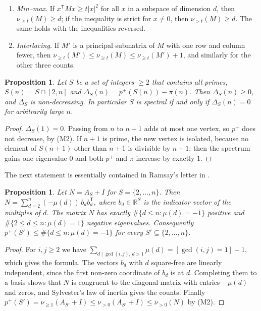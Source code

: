 \documentclass[11pt]{amsart}
\newtheorem{proposition}[theorem]{Proposition}
\theoremstyle{definition}
\theoremstyle{remark}
\newcommand{\pp}{p^{+}}
\newcommand{\R}{\mathbb R}
\newcommand{\nuge}[1]{\nu_{\ge #1}}
\begin{document}
\begin{enumerate}[label=\textup{(M\arabic*)},leftmargin=3em]
\item \emph{Min--max.} If $x^{\mathsf T}Mx\ge t|x|^2$ for all $x$ in a subspace of dimension $d$, then $\nuge{t}(M)\ge d$; if the inequality is strict for $x\ne0$, then $\nu_{>t}(M)\ge d$. The same holds with the inequalities reversed.
\item \emph{Interlacing.} If $M'$ is a principal submatrix of $M$ with one row and column fewer, then $\nuge{t}(M')\le\nuge{t}(M)\le\nuge{t}(M')+1$, and similarly for the other three counts.
\end{enumerate}

\begin{proposition}\label{prop:mono}
Let $S$ be a set of integers $\ge2$ that contains all primes, $S(n)=S\cap[2,n]$ and $\Delta_S(n)=\pp(S(n))-\pi(n)$. Then $\Delta_S(n)\ge0$, and $\Delta_S$ is non-decreasing. In particular $S$ is spectral if and only if $\Delta_S(n)=0$ for arbitrarily large $n$.
\end{proposition}
\begin{proof}
$\Delta_S(1)=0$. Passing from $n$ to $n+1$ adds at most one vertex, so $\pp$ does not decrease, by (M2). If $n+1$ is prime, the new vertex is isolated, because no element of $S(n+1)$ other than $n+1$ is divisible by $n+1$; then the spectrum gains one eigenvalue $0$ and both $\pp$ and $\pi$ increase by exactly $1$.
\end{proof}

The next statement is essentially contained in Ramsay's letter in \cite{WOW}.

\begin{proposition}\label{prop:inertia}
Let $N=A_S+I$ for $S=\{2,\dots,n\}$. Then $N=\sum_{d=2}^{n}(-\mu(d))\,b_db_d^{\mathsf T}$, where $b_d\in\R^S$ is the indicator vector of the multiples of $d$. The matrix $N$ has exactly $\#\{d\le n:\mu(d)=-1\}$ positive and $\#\{2\le d\le n:\mu(d)=1\}$ negative eigenvalues. Consequently $\pp(S')\le\#\{d\le n:\mu(d)=-1\}$ for every $S'\subseteq\{2,\dots,n\}$.
\end{proposition}
\begin{proof}
For $i,j\ge2$ we have $\sum_{d\mid\gcd(i,j),\,d>1}\mu(d)=[\gcd(i,j)=1]-1$, which gives the formula. The vectors $b_d$ with $d$ square-free are linearly independent, since the first non-zero coordinate of $b_d$ is at $d$. Completing them to a basis shows that $N$ is congruent to the diagonal matrix with entries $-\mu(d)$ and zeros, and Sylvester's law of inertia gives the counts. Finally $\pp(S')=\nuge1(A_{S'}+I)\le\nu_{>0}(A_{S'}+I)\le\nu_{>0}(N)$ by (M2).
\end{proof}
\end{document}
